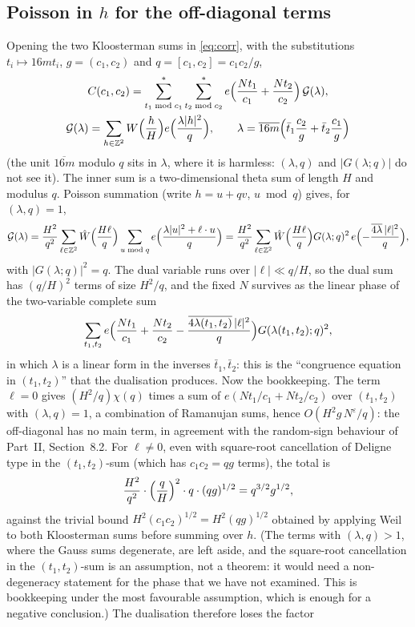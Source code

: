 \documentclass[11pt]{amsart}
\theoremstyle{remark}
\newcommand{\Z}{\mathbb{Z}}
\newcommand{\e}{\varepsilon}
\begin{document}
\subsection{Poisson in $h$ for the off-diagonal terms}
Opening the two Kloosterman sums in \eqref{eq:corr}, with the substitutions $t_i\mapsto16mt_i$, $g=(c_1,c_2)$ and $q=[c_1,c_2]=c_1c_2/g$,
\begin{gather*}
C(c_1,c_2)=\sum_{t_1\bmod c_1}^*\sum_{t_2\bmod c_2}^*e\Bigl(\frac{Nt_1}{c_1}+\frac{Nt_2}{c_2}\Bigr)\,\mathcal G(\lambda),\\
\mathcal G(\lambda)=\sum_{h\in\Z^2}W\Bigl(\frac hH\Bigr)e\Bigl(\frac{\lambda|h|^2}{q}\Bigr),\qquad \lambda=\overline{16m}\Bigl(\bar t_1\frac{c_2}g+\bar t_2\frac{c_1}g\Bigr)
\end{gather*}
(the unit $\overline{16m}$ modulo $q$ sits in $\lambda$, where it is harmless: $(\lambda,q)$ and $|G(\lambda;q)|$ do not see it).
The inner sum is a two-dimensional theta sum of length $H$ and modulus $q$. Poisson summation (write $h=u+qv$, $u\bmod q$) gives, for $(\lambda,q)=1$,
\[
\mathcal G(\lambda)=\frac{H^2}{q^2}\sum_{\ell\in\Z^2}\hat W\Bigl(\frac{H\ell}q\Bigr)\sum_{u\bmod q}e\Bigl(\frac{\lambda|u|^2+\ell\cdot u}{q}\Bigr)=\frac{H^2}{q^2}\sum_{\ell\in\Z^2}\hat W\Bigl(\frac{H\ell}q\Bigr)G(\lambda;q)^2\,e\Bigl(-\frac{\overline{4\lambda}\,|\ell|^2}{q}\Bigr),
\]
with $|G(\lambda;q)|^2=q$. The dual variable runs over $|\ell|\ll q/H$, so the dual sum has $(q/H)^2$ terms of size $H^2/q$, and the fixed $N$ survives as the linear phase of the two-variable complete sum
\[
\sum_{t_1,t_2}e\Bigl(\frac{Nt_1}{c_1}+\frac{Nt_2}{c_2}-\frac{\overline{4\lambda(t_1,t_2)}\,|\ell|^2}{q}\Bigr)G(\lambda(t_1,t_2);q)^2 ,
\]
in which $\lambda$ is a linear form in the inverses $\bar t_1,\bar t_2$: this is the ``congruence equation in $(t_1,t_2)$'' that the dualisation produces. Now the bookkeeping. The term $\ell=0$ gives $(H^2/q)\chi(q)$ times a sum of $e(Nt_1/c_1+Nt_2/c_2)$ over $(t_1,t_2)$ with $(\lambda,q)=1$, a combination of Ramanujan sums, hence $O(H^2g\,N^\e/q)$: the off-diagonal has no main term, in agreement with the random-sign behaviour of Part~II, Section~8.2. For $\ell\ne0$, even with square-root cancellation of Deligne type in the $(t_1,t_2)$-sum (which has $c_1c_2=qg$ terms), the total is
\[
\frac{H^2}{q^2}\cdot\Bigl(\frac qH\Bigr)^2\cdot q\cdot(qg)^{1/2}=q^{3/2}g^{1/2},
\]
against the trivial bound $H^2(c_1c_2)^{1/2}=H^2(qg)^{1/2}$ obtained by applying Weil to both Kloosterman sums before summing over $h$. (The terms with $(\lambda,q)>1$, where the Gauss sums degenerate, are left aside, and the square-root cancellation in the $(t_1,t_2)$-sum is an assumption, not a theorem: it would need a non-degeneracy statement for the phase that we have not examined. This is bookkeeping under the most favourable assumption, which is enough for a negative conclusion.) The dualisation therefore loses the factor
\end{document}

